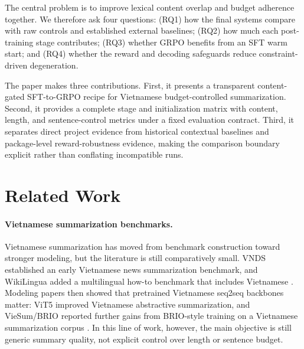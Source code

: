 \documentclass[11pt]{article}
\begin{document}
The central problem is to improve lexical content overlap and budget adherence together. We therefore ask four questions: (RQ1) how the final systems compare with raw controls and established external baselines; (RQ2) how much each post-training stage contributes; (RQ3) whether GRPO benefits from an SFT warm start; and (RQ4) whether the reward and decoding safeguards reduce constraint-driven degeneration.

The paper makes three contributions. First, it presents a transparent content-gated SFT-to-GRPO recipe for Vietnamese budget-controlled summarization. Second, it provides a complete stage and initialization matrix with content, length, and sentence-control metrics under a fixed evaluation contract. Third, it separates direct project evidence from historical contextual baselines and package-level reward-robustness evidence, making the comparison boundary explicit rather than conflating incompatible runs.


\section{Related Work}
\paragraph{Vietnamese summarization benchmarks.}
Vietnamese summarization has moved from benchmark construction toward stronger modeling, but the literature is still comparatively small.
VNDS established an early Vietnamese news summarization benchmark, and WikiLingua added a multilingual how-to benchmark that includes Vietnamese \citep{nguyen2019vnds,ladhak2020wikilingua}.
Modeling papers then showed that pretrained Vietnamese seq2seq backbones matter: ViT5 improved Vietnamese abstractive summarization, and VieSum/BRIO reported further gains from BRIO-style training on a Vietnamese summarization corpus \citep{phan2022vit5,lam2023viesum}.
In this line of work, however, the main objective is still generic summary quality, not explicit control over length or sentence budget.
\end{document}
